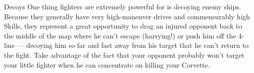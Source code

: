 
\begin{sidebox}{Decoys}
One thing fighters are extremely powerful for is decoying enemy ships. Because they generally have very high-maneuver drives and commensurably high  Skills, they represent a great opportunity to drag an injured opponent back to the middle of the map where he can't escape (harrying!) or push him off the 4-line --- decoying him so far and fast away from his target that he can't return to the fight. Take advantage of the fact that your opponent probably won't target your little fighter when he can concentrate on killing your Corvette.
\end{sidebox}
